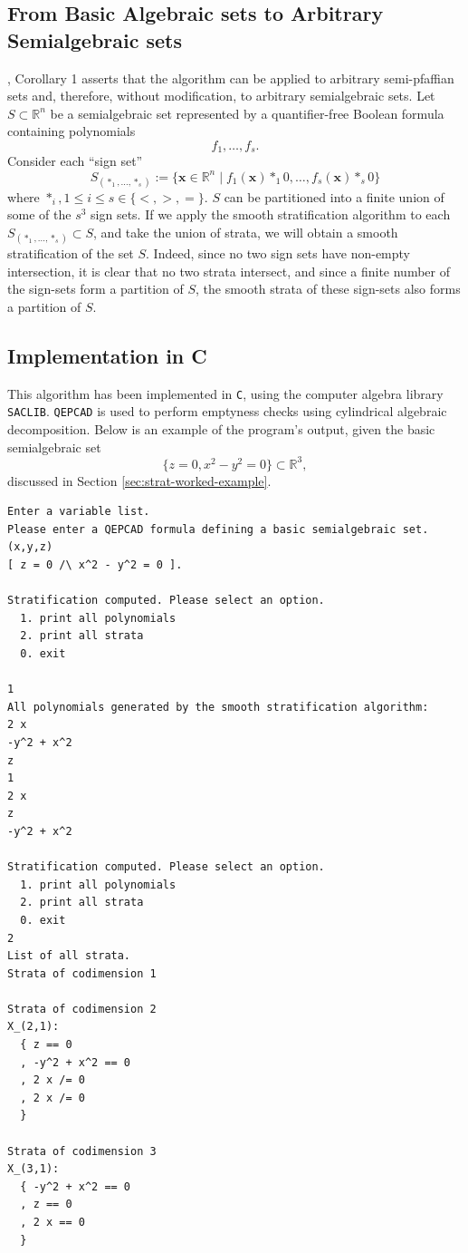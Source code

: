 \documentclass[
]{book}
\theoremstyle{definition}
\theoremstyle{definition}
\theoremstyle{definition}
\theoremstyle{definition}
\theoremstyle{remark}
\begin{document}
\hypertarget{sec:strat-semialgebraic}{%
\subsection{From Basic Algebraic sets to Arbitrary Semialgebraic sets}\label{sec:strat-semialgebraic}}

\citet{gv1995}, Corollary 1 asserts that the algorithm can be applied to arbitrary semi-pfaffian sets and, therefore, without modification, to arbitrary semialgebraic sets.
Let \(S \subset \mathbb{R}^n\) be a semialgebraic set represented by a quantifier-free Boolean formula containing polynomials
\[
f_1,\ldots,f_s.
\]
Consider each ``sign set''
\[
S_{( \ast_1,\ldots,\ast_s )} := \{ \mathbf{x} \in \mathbb{R}^n \mid f_1(\mathbf{x}) \ast_1 0, \ldots, f_s(\mathbf{x}) \ast_s 0 \}
\]
where \(\ast_i, 1 \le i \le s \in \{<, >, =\}\). \(S\) can be partitioned into a finite union of some of the \(s^3\) sign sets.
If we apply the smooth stratification algorithm to each \(S_{(\ast_1,\ldots,\ast_s)} \subset S\), and take the union of strata, we will obtain a smooth stratification of the set \(S\). Indeed, since no two sign sets have non-empty intersection, it is clear that no two strata intersect, and since a finite number of the sign-sets form a partition of \(S\), the smooth strata of these sign-sets also forms a partition of \(S\).

\hypertarget{implementation-in-c}{%
\subsection{Implementation in C}\label{implementation-in-c}}

This algorithm has been implemented in \texttt{C}, using the computer algebra library \texttt{SACLIB}. \texttt{QEPCAD} is used to perform emptyness checks using cylindrical algebraic decomposition. Below is an example of the program's output, given the basic semialgebraic set
\[
\{ z = 0, x^2 - y^2 = 0 \} \subset \mathbb{R}^3,
\]
discussed in Section \ref{sec:strat-worked-example}.

\begin{verbatim}
Enter a variable list.
Please enter a QEPCAD formula defining a basic semialgebraic set.
(x,y,z)
[ z = 0 /\ x^2 - y^2 = 0 ].

Stratification computed. Please select an option.
  1. print all polynomials
  2. print all strata
  0. exit

1
All polynomials generated by the smooth stratification algorithm:
2 x
-y^2 + x^2
z
1
2 x
z
-y^2 + x^2

Stratification computed. Please select an option.
  1. print all polynomials
  2. print all strata
  0. exit
2
List of all strata.
Strata of codimension 1

Strata of codimension 2
X_(2,1):
  { z == 0
  , -y^2 + x^2 == 0
  , 2 x /= 0
  , 2 x /= 0
  }

Strata of codimension 3
X_(3,1):
  { -y^2 + x^2 == 0
  , z == 0
  , 2 x == 0
  }
\end{verbatim}
\end{document}
